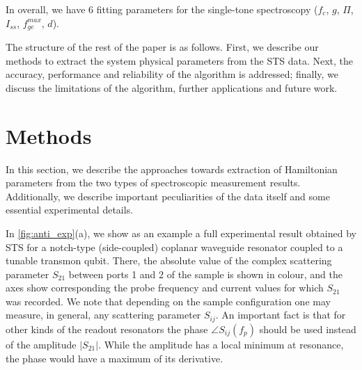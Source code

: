 \documentclass[%
 aip,
 draft,
 amsmath,amssymb,
 reprint,%
]{revtex4-1}
\begin{document}
In overall, we have 6 fitting parameters for the single-tone spectroscopy ($f_c$, $g$, $\Pi$, $I_{ss}$, $f_{ge}^{max}$, $d$).

The structure of the rest of the paper is as follows. First, we describe our methods to extract the system physical parameters from the STS data. Next, the accuracy, performance and reliability of the algorithm is addressed; finally, we discuss the limitations of the algorithm, further applications and future work. 



\section{Methods}

In this section, we describe the approaches towards extraction of Hamiltonian parameters from the two types of spectroscopic measurement results. Additionally, we describe important peculiarities of the data itself and some essential experimental details.

In \autoref{fig:anti_exp}(a), we show as an example a full experimental result obtained by STS for a notch-type (side-coupled) coplanar waveguide resonator coupled to a tunable transmon qubit. There, the absolute value of the complex scattering parameter $S_{21}$ between ports 1 and 2 of the sample is shown in colour, and the axes show corresponding the probe frequency and current values for which $S_{21}$ was recorded. We note that depending on the sample configuration one may measure, in general, any scattering parameter $S_{ij}$. An important fact is that for other kinds of the readout resonators the phase $\angle S_{ij}(f_p)$ should be used instead of the amplitude $|S_{21}|$. While the amplitude has a local minimum at resonance, the phase would have a maximum of its derivative.
\end{document}
